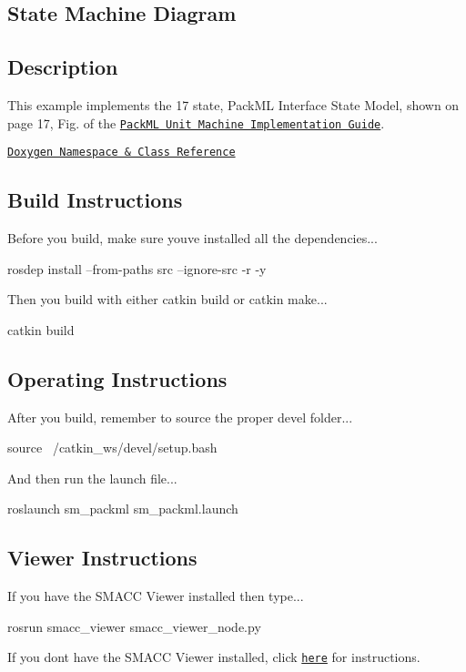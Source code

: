 \subsection*{State Machine Diagram}



\subsection*{Description}

This example implements the 17 state, Pack\+ML Interface State Model, shown on page 17, Fig. of the \href{http://omac.org/wp-content/uploads/2016/11/PackML_Unit_Machine_Implementation_Guide-V1-00.pdf}{\tt Pack\+ML Unit Machine Implementation Guide}.~\newline


\href{https://reelrbtx.github.io/SMACC_Documentation/master/html/namespacesm__packml.html}{\tt Doxygen Namespace \& Class Reference}

\subsection*{Build Instructions}

Before you build, make sure you\textquotesingle{}ve installed all the dependencies...


\begin{DoxyCode}
rosdep install --from-paths src --ignore-src -r -y 
\end{DoxyCode}


Then you build with either catkin build or catkin make...


\begin{DoxyCode}
catkin build
\end{DoxyCode}


\subsection*{Operating Instructions}

After you build, remember to source the proper devel folder...


\begin{DoxyCode}
source ~/catkin\_ws/devel/setup.bash
\end{DoxyCode}


And then run the launch file...


\begin{DoxyCode}
roslaunch sm\_packml sm\_packml.launch
\end{DoxyCode}


\subsection*{Viewer Instructions}

If you have the S\+M\+A\+CC Viewer installed then type...


\begin{DoxyCode}
rosrun smacc\_viewer smacc\_viewer\_node.py
\end{DoxyCode}


If you don\textquotesingle{}t have the S\+M\+A\+CC Viewer installed, click \href{http://smacc.ninja/smacc-viewer/}{\tt here} for instructions. 